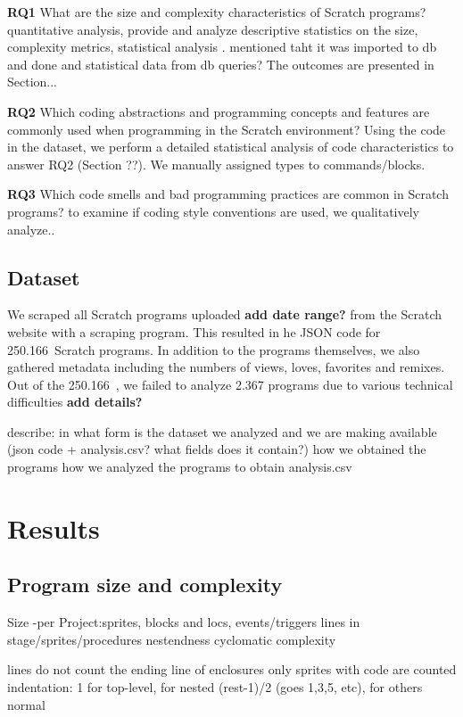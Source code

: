 \documentclass{sig-alternate}
\newcommand{\nPrograms}{250.166}
\newcommand{\todo}[1]{\textbf{#1}}
\begin{document}
\textbf{RQ1} What are the size and complexity characteristics of Scratch programs? quantitative analysis, provide and analyze descriptive statistics on the size, complexity metrics, statistical analysis . mentioned taht it was imported to db and done and statistical data from db queries? The outcomes are presented in Section...

\textbf{RQ2} Which coding abstractions and programming concepts and features are commonly used when programming in the Scratch environment? Using the code in the dataset, we perform a detailed statistical analysis of code characteristics to answer RQ2 (Section ??). We manually assigned types to commands/blocks.

\textbf{RQ3} Which code smells and bad programming practices are common in Scratch programs?  to examine if coding style conventions are used, we qualitatively analyze..

\subsection{Dataset}
\label{dataset}

We scraped all Scratch programs uploaded \todo{add date range?} from the Scratch website with a scraping program. This resulted in he JSON code for \nPrograms~Scratch programs. In addition to the programs themselves, we also gathered metadata including the numbers of views, loves, favorites and remixes. Out of the \nPrograms~, we failed to analyze 2.367 programs due to various technical difficulties \todo{add details?} 

describe:
in what form is the dataset we analyzed and we are making available (json code + analysis.csv? what fields does it contain?)
how we obtained the programs
how we analyzed the programs to obtain analysis.csv

\section{Results}

\subsection{Program size and complexity}
Size -per Project:sprites, blocks and locs, events/triggers
lines in stage/sprites/procedures
nestendness	
cyclomatic complexity	

lines do not count the ending line of enclosures
only sprites with code are counted
indentation: 1 for top-level, for nested (rest-1)/2 (goes 1,3,5, etc), for others normal
\end{document}
